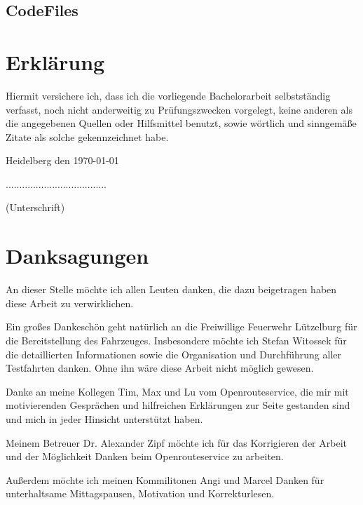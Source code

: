 \subsection*{CodeFiles}

\newpage
\section*{Erklärung}
\vspace{1cm}
Hiermit versichere ich, dass ich die vorliegende Bachelorarbeit selbstständig verfasst, noch nicht anderweitig zu Prüfungszwecken vorgelegt, keine anderen als die angegebenen Quellen oder Hilfsmittel benutzt, sowie wörtlich und sinngemäße Zitate als solche gekennzeichnet habe.\par
\bigskip

{\flushleft Heidelberg den \today } {\hfill .....................................\par}
{\hfill (Unterschrift)}

\newpage
\section*{Danksagungen}

An dieser Stelle möchte ich allen Leuten danken, die dazu beigetragen haben diese Arbeit zu verwirklichen.\par
\vspace{0.5cm}
Ein großes Dankeschön geht natürlich an die Freiwillige Feuerwehr Lützelburg für die Bereitstellung des Fahrzeuges.
Insbesondere möchte ich Stefan Witossek für die detaillierten Informationen sowie die Organisation und Durchführung aller Testfahrten danken.
Ohne ihn wäre diese Arbeit nicht möglich gewesen.\par
\vspace{0.5cm}
Danke an meine Kollegen Tim, Max und Lu vom Openrouteservice, die mir mit motivierenden Gesprächen und hilfreichen Erklärungen zur Seite gestanden sind und mich in jeder Hinsicht unterstützt haben.\par
\vspace{0.5cm}
Meinem Betreuer Dr. Alexander Zipf möchte ich für das Korrigieren der Arbeit und der Möglichkeit Danken beim Openrouteservice zu arbeiten.\par
\vspace{0.5cm}
Außerdem möchte ich meinen Kommilitonen Angi und Marcel Danken für unterhaltsame Mittagspausen, Motivation und Korrekturlesen.

\newpage
{}
